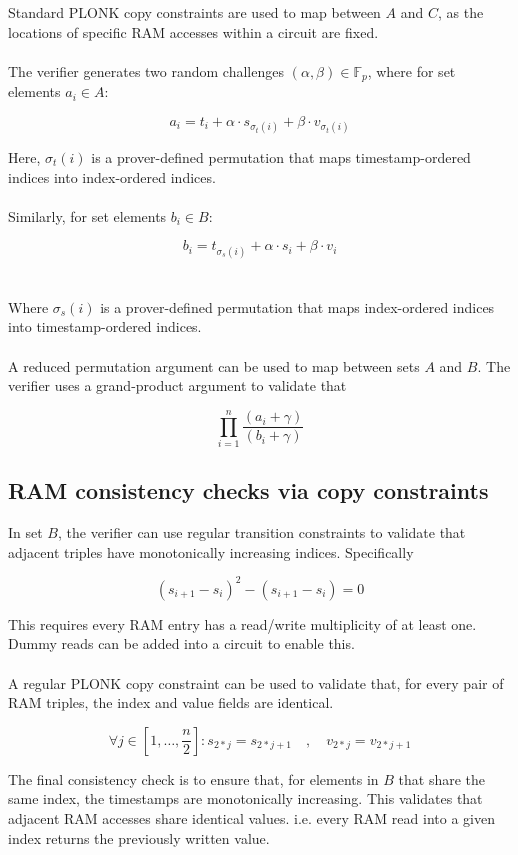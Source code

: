 \documentclass[11pt]{article} %
\newcommand{\F}{\ensuremath{\mathbb F}\xspace}
\begin{document}
Standard PLONK copy constraints are used to map between $A$ and $C$, as the locations of specific RAM accesses within a circuit are fixed.
\\
\\
The verifier generates two random challenges $(\alpha, \beta) \in \F_p$, where for set elements $a_i \in A$:

$$ a_i = t_{i} + \alpha \cdot s_{\sigma_t(i)} + \beta \cdot v_{\sigma_t(i)}$$

Here, $\sigma_t(i)$ is a prover-defined permutation that maps timestamp-ordered indices into index-ordered indices.
\\
\\
Similarly, for set elements $b_i \in B:$

$$b_i = t_{\sigma_s(i)} + \alpha \cdot s_i + \beta \cdot v_i $$
\\
\\
Where $\sigma_s(i)$ is a prover-defined permutation that maps index-ordered indices into timestamp-ordered indices.
\\
\\
A reduced permutation argument can be used to map between sets $A$ and $B$. The verifier uses a grand-product argument to validate that

$$
\prod_{i=1}^n \frac{(a_i + \gamma)}{(b_i + \gamma)}
$$

\subsection{RAM consistency checks via copy constraints}

In set $B$, the verifier can use regular transition constraints to validate that adjacent triples have monotonically increasing indices. Specifically

$$
(s_{i + 1} - s_i)^2 - (s_{i + 1} - s_i) = 0
$$

This requires every RAM entry has a read/write multiplicity of at least one. Dummy reads can be added into a circuit to enable this.
\\
\\
A regular PLONK copy constraint can be used to validate that, for every pair of RAM triples, the index and value fields are identical.

$$
\forall j \in [1, \ldots, \frac{n}{2}]: s_{2*j} = s_{2 * j + 1} \quad , \quad v_{2 * j} = v_{2 * j + 1}
$$

The final consistency check is to ensure that, for elements in $B$ that share the same index, the timestamps are monotonically increasing. This validates that adjacent RAM accesses share identical values. i.e. every RAM read into a given index returns the previously written value.
\end{document}
